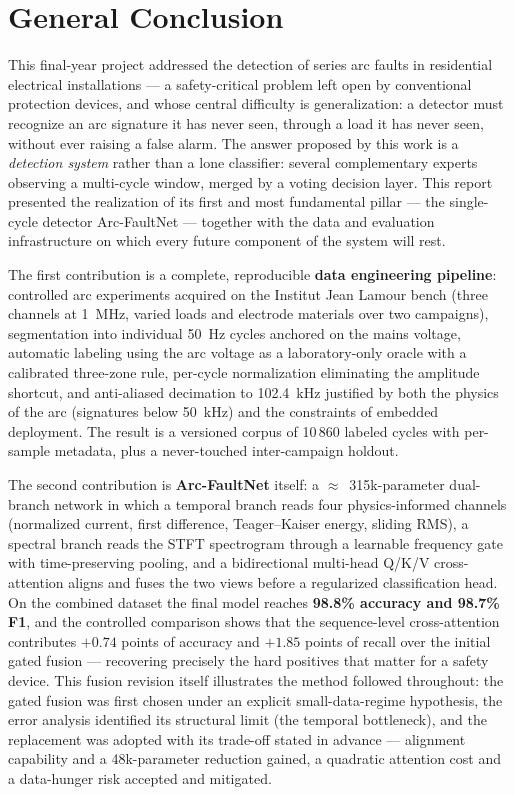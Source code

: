 \chapter*{General Conclusion}

This final-year project addressed the detection of series arc faults in residential electrical installations --- a safety-critical problem left open by conventional protection devices, and whose central difficulty is generalization: a detector must recognize an arc signature it has never seen, through a load it has never seen, without ever raising a false alarm. The answer proposed by this work is a \emph{detection system} rather than a lone classifier: several complementary experts observing a multi-cycle window, merged by a voting decision layer. This report presented the realization of its first and most fundamental pillar --- the single-cycle detector Arc-FaultNet --- together with the data and evaluation infrastructure on which every future component of the system will rest.

\medskip

The first contribution is a complete, reproducible \textbf{data engineering pipeline}: controlled arc experiments acquired on the Institut Jean Lamour bench (three channels at 1~MHz, varied loads and electrode materials over two campaigns), segmentation into individual 50~Hz cycles anchored on the mains voltage, automatic labeling using the arc voltage as a laboratory-only oracle with a calibrated three-zone rule, per-cycle normalization eliminating the amplitude shortcut, and anti-aliased decimation to 102.4~kHz justified by both the physics of the arc (signatures below 50~kHz) and the constraints of embedded deployment. The result is a versioned corpus of 10\,860 labeled cycles with per-sample metadata, plus a never-touched inter-campaign holdout.

\medskip

The second contribution is \textbf{Arc-FaultNet} itself: a $\approx$~315k-parameter dual-branch network in which a temporal branch reads four physics-informed channels (normalized current, first difference, Teager--Kaiser energy, sliding RMS), a spectral branch reads the STFT spectrogram through a learnable frequency gate with time-preserving pooling, and a bidirectional multi-head Q/K/V cross-attention aligns and fuses the two views before a regularized classification head. On the combined dataset the final model reaches \textbf{98.8\% accuracy and 98.7\% F1}, and the controlled comparison shows that the sequence-level cross-attention contributes $+0.74$ points of accuracy and $+1.85$ points of recall over the initial gated fusion --- recovering precisely the hard positives that matter for a safety device. This fusion revision itself illustrates the method followed throughout: the gated fusion was first chosen under an explicit small-data-regime hypothesis, the error analysis identified its structural limit (the temporal bottleneck), and the replacement was adopted with its trade-off stated in advance --- alignment capability and a 48k-parameter reduction gained, a quadratic attention cost and a data-hunger risk accepted and mitigated.

